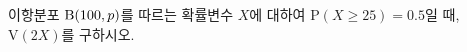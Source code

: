 이항분포 $\mathrm{B}(100{,}\mkern3mu\mathopen{}p)$를 따르는 확률변수 $X$에 대하여 $\mathrm{P}(X\ge 25)=0.5$일 때, $\mathrm{V}(2X)$를 구하시오. 
